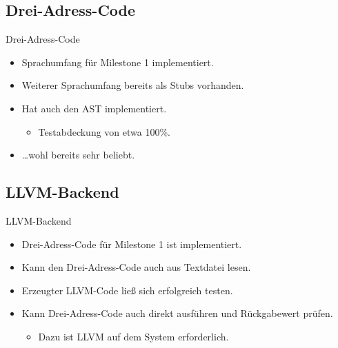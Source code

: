 \documentclass[ucs,10pt]{beamer}
\newlength{\wideitemsep}
\let\olditem\item
\renewcommand{\item}{\setlength{\itemsep}{\wideitemsep}\olditem}
\begin{document}
\subsection{Drei-Adress-Code}
\begin{frame}{Drei-Adress-Code}
	\begin{itemize}
		\item Sprachumfang für Milestone 1 implementiert.
		\item Weiterer Sprachumfang bereits als Stubs vorhanden.
		\item Hat auch den AST implementiert.
		\begin{itemize}
			\item Testabdeckung von etwa 100\%.
		\end{itemize}
		\item \dots wohl bereits sehr beliebt.
	\end{itemize}
\end{frame}

\subsection{LLVM-Backend}
\begin{frame}{LLVM-Backend}
	\begin{itemize}
		\item Drei-Adress-Code für Milestone 1 ist implementiert.
		\item Kann den Drei-Adress-Code auch aus Textdatei lesen.
		\item Erzeugter LLVM-Code ließ sich erfolgreich testen.
		\item Kann Drei-Adress-Code auch direkt ausführen und Rückgabewert prüfen.
		\begin{itemize}
			\item Dazu ist LLVM auf dem System erforderlich.
		\end{itemize}
	\end{itemize}
\end{frame}
\end{document}
